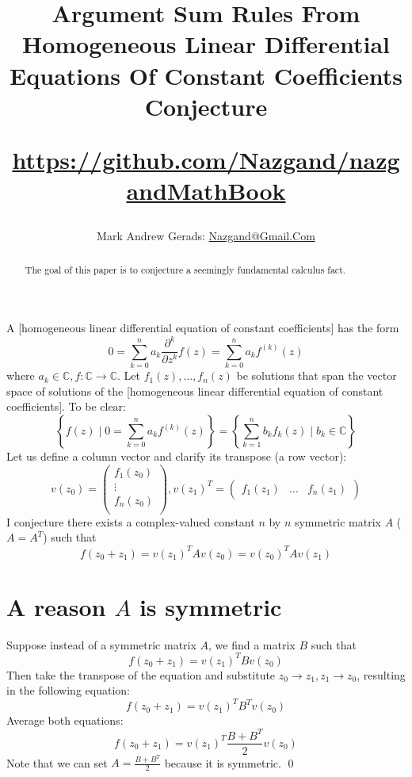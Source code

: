 \documentclass[]{article}
\author{Mark Andrew Gerads: \href{MailTo:Nazgand@Gmail.Com}{Nazgand@Gmail.Com}}
\title{
	Argument Sum Rules From Homogeneous Linear Differential Equations Of Constant Coefficients Conjecture
	
	\href{https://github.com/Nazgand/nazgandMathBook}{https://github.com/Nazgand/nazgandMathBook}
}
\newcommand{\pqty}[1]{{\left(#1\right)}}
\newcommand{\Bqty}[1]{{\left\{#1\right\}}}
\newcommand{\pdiff}[2]{\frac{\partial^{#2}}{\partial #1^{#2}}}
\numberwithin{equation}{section}
\begin{document}
	
	\maketitle
	
	\begin{abstract}
		The goal of this paper is to conjecture a seemingly fundamental calculus fact.
	\end{abstract}
	
	A [homogeneous linear differential equation of constant coefficients] has the form
	\begin{equation}
		0=\sum_{k=0}^{n}a_k\pdiff{z}{k}f\pqty{z}
		=\sum_{k=0}^{n}a_k f^\pqty{k}\pqty{z}
	\end{equation}
	where $a_k\in\mathbb{C}, f:\mathbb{C}\to\mathbb{C}$.
	Let $f_1\pqty{z},\dots,f_n\pqty{z}$ be solutions that span the vector space of solutions of the [homogeneous linear differential equation of constant coefficients]. To be clear:
	\begin{equation}
		\Bqty{f\pqty{z} \mid 0=\sum_{k=0}^{n}a_k f^\pqty{k}\pqty{z}}
		=\Bqty{\sum_{k=1}^{n}b_k f_k\pqty{z} \mid b_k\in\mathbb{C}}
	\end{equation}
	Let us define a column vector and clarify its transpose (a row vector):
	\begin{equation}
		v\pqty{z_0}=
		\begin{pmatrix}
			f_1\pqty{z_0} \\
			\vdots \\
			f_n\pqty{z_0} \\
		\end{pmatrix}
		,
		v\pqty{z_1}^T=
		\begin{pmatrix}
			f_1\pqty{z_1} &
			\dots &
			f_n\pqty{z_1}
		\end{pmatrix}
	\end{equation}
	I conjecture there exists a complex-valued constant $n$ by $n$ symmetric matrix $A$ ($A=A^T$) such that
	\begin{equation}
		f\pqty{z_0+z_1}=v\pqty{z_1}^T A v\pqty{z_0}=v\pqty{z_0}^T A v\pqty{z_1}
	\end{equation}

	\section{A reason $A$ is symmetric}
	Suppose instead of a symmetric matrix $A$, we find a matrix $B$ such that
	\begin{equation}
		f\pqty{z_0+z_1}=v\pqty{z_1}^T B v\pqty{z_0}
	\end{equation}
	Then take the transpose of the equation and substitute $z_0\to z_1,z_1\to z_0$, resulting in the following equation:
	\begin{equation}
		f\pqty{z_0+z_1}=v\pqty{z_1}^T B^T v\pqty{z_0}
	\end{equation}
	Average both equations:
	\begin{equation}
		f\pqty{z_0+z_1}=v\pqty{z_1}^T \frac{B+B^T}{2} v\pqty{z_0}
	\end{equation}
	Note that we can set $A=\frac{B+B^T}{2}$ because it is symmetric. \qed
\end{document}
